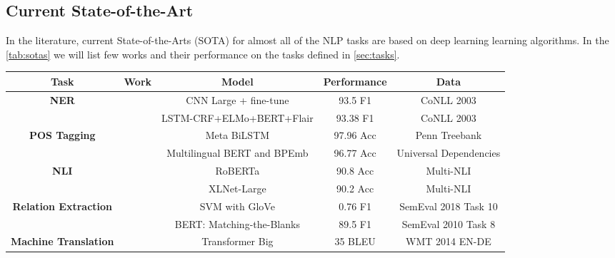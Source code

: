 \subsection{Current State-of-the-Art}\label{sec:sotas}
In the literature, current State-of-the-Arts (SOTA) for almost all of the NLP tasks are based on deep learning learning algorithms. In the \cref{tab:sotas} we will list few works and their performance on the tasks defined in \cref{sec:tasks}.

\begin{sidewaystable}[!htbp]
  \begin{center}
    \caption{Current State-of-the-Arts. We can see that almost all of the works are based on deep learning.}
    \label{tab:sotas}
    \begin{tabular}{|c|c|c|c|c|}
      \hline
      \textbf{Task} & \textbf{Work} & \textbf{Model} & \textbf{Performance} & \textbf{Data}\\
      \hline
      \textbf{NER} & \cite{baevski2019cloze} & CNN Large + fine-tune & 93.5 F1 & CoNLL 2003\\
      & \cite{strakova-etal-2019-neural} & LSTM-CRF+ELMo+BERT+Flair & 93.38 F1 & CoNLL 2003\\
      \hline
      \textbf{POS Tagging} & \cite{Bohnet_2018} & Meta BiLSTM & 97.96 Acc & Penn Treebank\\
      & \cite{Heinzerling_2019} & Multilingual BERT and BPEmb & 96.77 Acc &  Universal Dependencies\\
      \hline
      \textbf{NLI} & \cite{liu2019roberta} & RoBERTa & 90.8 Acc & Multi-NLI\\
      & \cite{yang2019xlnet} & XLNet-Large & 90.2 Acc & Multi-NLI\\
      \hline
      \textbf{Relation Extraction} & \cite{lai-etal-2018-sunnynlp} & SVM with GloVe & 0.76 F1 & SemEval 2018 Task 10\\
      & \cite{baldini-soares-etal-2019-matching} & BERT: Matching-the-Blanks & 89.5 F1 & SemEval 2010 Task 8\\
      \hline
      \textbf{Machine Translation} & \cite{edunov2018understanding} & Transformer Big & 35 BLEU  & WMT 2014 EN-DE\\

\end{tabular}
\end{center}
\end{sidewaystable}
